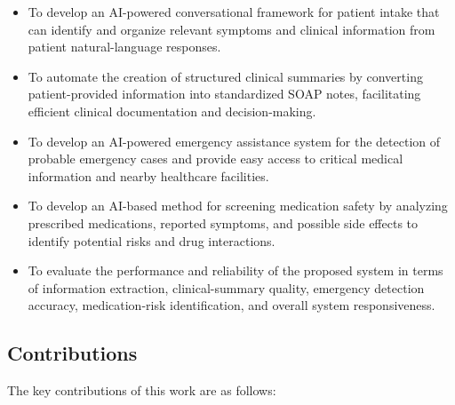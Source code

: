 \documentclass[conference]{IEEEtran}
\begin{document}
\begin{itemize}
    \item To develop an AI-powered conversational framework for patient intake that can identify and organize relevant symptoms and clinical information from patient natural-language responses.

    \item To automate the creation of structured clinical summaries by converting patient-provided information into standardized SOAP notes, facilitating efficient clinical documentation and decision-making.

    \item To develop an AI-powered emergency assistance system for the detection of probable emergency cases and provide easy access to critical medical information and nearby healthcare facilities.

    \item To develop an AI-based method for screening medication safety by analyzing prescribed medications, reported symptoms, and possible side effects to identify potential risks and drug interactions.

    \item To evaluate the performance and reliability of the proposed system in terms of information extraction, clinical-summary quality, emergency detection accuracy, medication-risk identification, and overall system responsiveness.
\end{itemize}

\subsection{Contributions}

The key contributions of this work are as follows:
\end{document}
